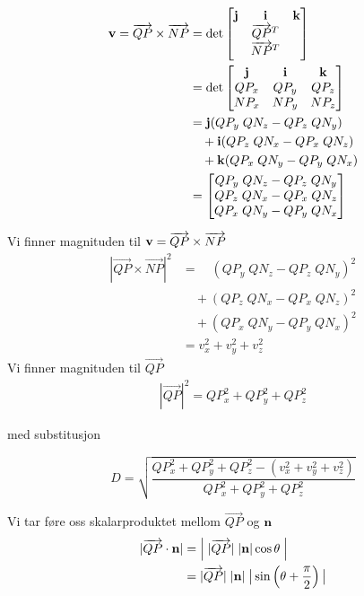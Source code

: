\documentclass{article}
\numberwithin{equation}{section}
\begin{document}
\begin{align}
  \bold{v} = \overrightarrow{QP}\times\overrightarrow{NP}
  &=
  \det\begin{bmatrix}
    \bold{j} & \bold{i} & \bold{k} \\
    &\overrightarrow{QP}^T&\\
    &\overrightarrow{NP}^T&\\
  \end{bmatrix}
  \\
  &=
  \det\begin{bmatrix}
    \bold{j} & \bold{i} & \bold{k} \\
    QP_x&QP_y&QP_z\\
    NP_x&NP_y&NP_z\\
  \end{bmatrix}
  \\
  &=
    \bold{j}(QP_{y} \; QN_{z} - QP_{z} \; QN_{y})\\
    &\quad+\bold{i}(QP_{z} \; QN_{x} - QP_{x} \; QN_{z})\\
    &\quad+\bold{k}(QP_{x} \; QN_{y} - QP_{y} \; QN_{x}) 
  \\
  &=
  \begin{bmatrix}
    QP_{y} \; QN_{z} - QP_{z} \; QN_{y}\\
    QP_{z} \; QN_{x} - QP_{x} \; QN_{z}\\
    QP_{x} \; QN_{y} - QP_{y} \; QN_{x} 
  \end{bmatrix}
  \label{eq:crossprod}
\end{align}

Vi finner magnituden til $\bold {v} = \overrightarrow{QP}\times\overrightarrow{NP}$
\begin{align}
  |\overrightarrow{QP}\times\overrightarrow{NP}|^2&=
    \quad(QP_{y} \; QN_{z} - QP_{z} \; QN_{y})^2\\
    &\quad +(QP_{z} \; QN_{x} - QP_{x} \; QN_{z})^2\\
    &\quad +(QP_{x} \; QN_{y} - QP_{y} \; QN_{x})^2\\
    &= 
    v_x^2+v_y^2+v_z^2
\end{align}
Vi finner magnituden til $\overrightarrow{QP}$
\begin{align}
  |\overrightarrow{QP}|^2=
    QP_{x}^2
    +QP_{y}^2
    +QP_{z}^2
\end{align}

med substitusjon

\begin{equation}
  D=\displaystyle\sqrt{\frac
  {
    QP_{x}^2
    +QP_{y}^2
    +QP_{z}^2
  - (
  v_x^2+v_y^2+v_z^2
  )
  }
  {
    QP_{x}^2
    +QP_{y}^2
    +QP_{z}^2
  }
  }
  \label{eq:D 3}
\end{equation}

Vi tar føre oss skalarproduktet mellom $\overrightarrow{QP}$ og $\bold{n}$
\begin{align}
  |\overrightarrow{QP}\cdot\bold{n}|&=\Big{|}\;|\overrightarrow{QP}|\;|\bold{n}|\cos{\theta}\;\Big{|} \\
  &=|\overrightarrow{QP}|\;|\bold{n}|\;\big|\sin\left({\theta+\frac{\pi}{2}}\right)\big|
\end{align}
\end{document}

